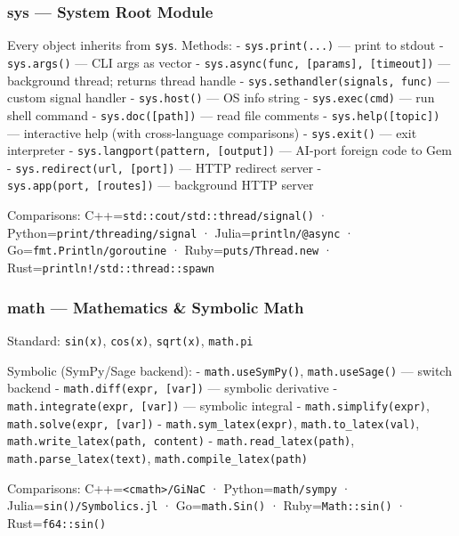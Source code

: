 \documentclass[
]{article}
\begin{document}
\subsubsection{sys --- System Root Module}\label{sys-system-root-module}

Every object inherits from \texttt{sys}. Methods: -
\texttt{sys.print(...)} --- print to stdout - \texttt{sys.args()} ---
CLI args as vector -
\texttt{sys.async(func,\ {[}params{]},\ {[}timeout{]})} --- background
thread; returns thread handle - \texttt{sys.sethandler(signals,\ func)}
--- custom signal handler - \texttt{sys.host()} --- OS info string -
\texttt{sys.exec(cmd)} --- run shell command -
\texttt{sys.doc({[}path{]})} --- read file comments -
\texttt{sys.help({[}topic{]})} --- interactive help (with cross-language
comparisons) - \texttt{sys.exit()} --- exit interpreter -
\texttt{sys.langport(pattern,\ {[}output{]})} --- AI-port foreign code
to Gem - \texttt{sys.redirect(url,\ {[}port{]})} --- HTTP redirect
server - \texttt{sys.app(port,\ {[}routes{]})} --- background HTTP
server

Comparisons: C++=\texttt{std::cout/std::thread/signal()} ·
Python=\texttt{print/threading/signal} · Julia=\texttt{println/@async} ·
Go=\texttt{fmt.Println/goroutine} · Ruby=\texttt{puts/Thread.new} ·
Rust=\texttt{println!/std::thread::spawn}

\subsubsection{math --- Mathematics \& Symbolic
Math}\label{math-mathematics-symbolic-math}

Standard: \texttt{sin(x)}, \texttt{cos(x)}, \texttt{sqrt(x)},
\texttt{math.pi}

Symbolic (SymPy/Sage backend): - \texttt{math.useSymPy()},
\texttt{math.useSage()} --- switch backend -
\texttt{math.diff(expr,\ {[}var{]})} --- symbolic derivative -
\texttt{math.integrate(expr,\ {[}var{]})} --- symbolic integral -
\texttt{math.simplify(expr)}, \texttt{math.solve(expr,\ {[}var{]})} -
\texttt{math.sym\_latex(expr)}, \texttt{math.to\_latex(val)},
\texttt{math.write\_latex(path,\ content)} -
\texttt{math.read\_latex(path)}, \texttt{math.parse\_latex(text)},
\texttt{math.compile\_latex(path)}

Comparisons: C++=\texttt{\textless{}cmath\textgreater{}/GiNaC} ·
Python=\texttt{math/sympy} · Julia=\texttt{sin()/Symbolics.jl} ·
Go=\texttt{math.Sin()} · Ruby=\texttt{Math::sin()} ·
Rust=\texttt{f64::sin()}
\end{document}
